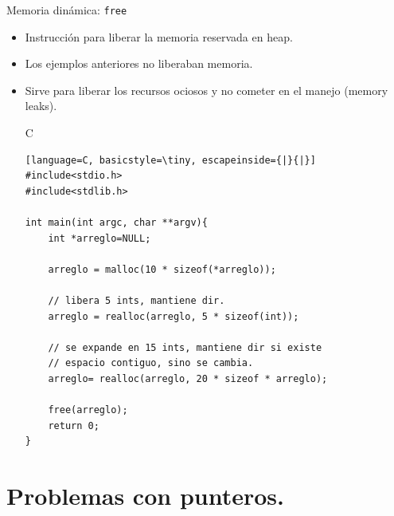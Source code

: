 \documentclass{beamer}
\begin{document}
\begin{frame}[fragile]{Memoria dinámica: \texttt{free}}
\begin{itemize}
\item Instrucción para liberar la memoria reservada en heap.
\item Los ejemplos anteriores no liberaban memoria.
\item Sirve para liberar los recursos ociosos y no cometer en el manejo (memory leaks).

\begin{exampleblock}{C}
\begin{lstlisting}[language=C, basicstyle=\tiny, escapeinside={|}{|}]
#include<stdio.h>
#include<stdlib.h>

int main(int argc, char **argv){
	int *arreglo=NULL;

	arreglo = malloc(10 * sizeof(*arreglo));

	// libera 5 ints, mantiene dir.
	arreglo = realloc(arreglo, 5 * sizeof(int));

	// se expande en 15 ints, mantiene dir si existe
	// espacio contiguo, sino se cambia.
	arreglo= realloc(arreglo, 20 * sizeof * arreglo);

	free(arreglo);
	return 0;
}
\end{lstlisting}
\end{exampleblock}
\end{itemize}
\end{frame}

\section{Problemas con punteros.}

\end{document}
